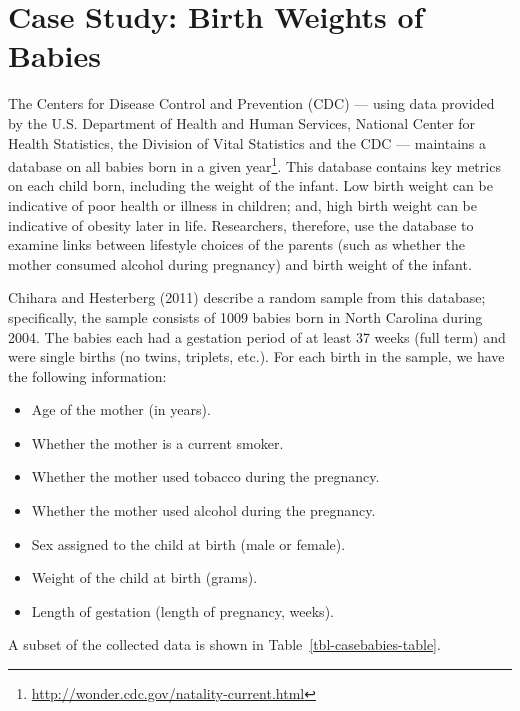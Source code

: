 \documentclass[
  letterpaper,
  DIV=11,
  numbers=noendperiod]{scrreprt}
\providecommand{\tightlist}{%
  \setlength{\itemsep}{0pt}\setlength{\parskip}{0pt}}\usepackage{longtable,booktabs,array}
\theoremstyle{definition}
\theoremstyle{definition}
\theoremstyle{plain}
\theoremstyle{remark}
\begin{document}
\chapter{Case Study: Birth Weights of Babies}\label{sec-casebabies}

The Centers for Disease Control and Prevention (CDC) --- using data
provided by the U.S. Department of Health and Human Services, National
Center for Health Statistics, the Division of Vital Statistics and the
CDC --- maintains a database on all babies born in a given
year\footnote{\url{http://wonder.cdc.gov/natality-current.html}}. This
database contains key metrics on each child born, including the weight
of the infant. Low birth weight can be indicative of poor health or
illness in children; and, high birth weight can be indicative of obesity
later in life. Researchers, therefore, use the database to examine links
between lifestyle choices of the parents (such as whether the mother
consumed alcohol during pregnancy) and birth weight of the infant.

Chihara and Hesterberg (2011) describe a random sample from this
database; specifically, the sample consists of 1009 babies born in North
Carolina during 2004. The babies each had a gestation period of at least
37 weeks (full term) and were single births (no twins, triplets, etc.).
For each birth in the sample, we have the following information:

\begin{itemize}
\tightlist
\item
  Age of the mother (in years).
\item
  Whether the mother is a current smoker.
\item
  Whether the mother used tobacco during the pregnancy.
\item
  Whether the mother used alcohol during the pregnancy.
\item
  Sex assigned to the child at birth (male or female).
\item
  Weight of the child at birth (grams).
\item
  Length of gestation (length of pregnancy, weeks).
\end{itemize}

A subset of the collected data is shown in
Table~\ref{tbl-casebabies-table}.
\end{document}
